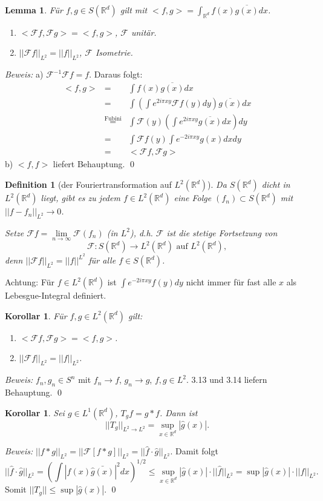 \documentclass[12pt]{extreport} %
\newtheorem{Definition}[Satz]{Definition}
\newtheorem{Lemma}[Satz]{Lemma}
\newtheorem{Korollar}[Satz]{Korollar}
\numberwithin{equation}{section}
\newcommand{\R}{\mathbb{R}} %
\newcommand{\f}{\hat{f}}
\newcommand{\g}{\hat{g}}
\newcommand{\F}{\mathcal{F}}
\newcommand{\m}{\cdot}
\newcommand{\Bew}{\emph{Beweis: }}
\begin{document}
	\begin{Lemma}
		Für $f, g\in S(\R^d)$ gilt mit $<f,g> = \int_{\R^{d}} f(x) \overline{g(x)}dx$.
		\begin{enumerate}
			\item[a)] $<\F f,\F g> = <f,g>$, $\F$ unitär.
			\item[b)] $||\F f||_{L^2} = ||f||_{L^2}$, $\F$ Isometrie.
		\end{enumerate}
	\end{Lemma}
	\Bew a) $\F^{-1}\F f = f$. Daraus folgt:
	\begin{eqnarray}
		<f,g> &=&\int f(x)\overline{g(x)}dx\nonumber\\
		&=& \int\left(\int e^{2i\pi x y}\F f(y)dy \right)\overline{g(x)}dx \nonumber \\
		&\overset{\text{Fubini}}{=}& \int \F(y)\left(\int e^{2i\pi xy} \overline{g(x)}dx\right)dy\nonumber\\
		&=& \int \F f(y) \int e^{-2i\pi xy}g(x)dx dy\nonumber\\
		&=& <\F f, \F g>\nonumber
	\end{eqnarray}
	b) $<f,f>$ liefert Behauptung.
	\qed
	
	\begin{Definition}[der Fouriertransformation auf $L^2(\R^d)$]
		Da $S(\R^d)$ dicht in $L^{2}(\R^d)$ liegt, gibt es zu jedem $f\in L^{2}(\R^d)$ eine Folge $(f_n)\subset S(\R^d)$ mit $||f-f_n||_{L^2}\rightarrow 0$.
		
		Setze $\F f =\lim\limits_{n\rightarrow\infty}\F(f_n)$ (in $L^2$), d.h. $\F$ ist die stetige Fortsetzung von 
		$$\F:S(\R^d)\rightarrow L^2(\R^d) \text{ auf } L^2(\R^d),$$	
		denn $||\F f||_{L^2} = ||f||^{L^2}$ für alle $f\in S(\R^d)$.
	\end{Definition}
	Achtung: Für $f\in L^2(\R^d)$ ist $\int e^{-2i\pi xy}f(y)dy$ nicht immer für fast alle $x$ als Lebesgue-Integral definiert.
	
	\begin{Korollar}
		Für $f, g\in L^2(\R^d)$ gilt:
		\begin{enumerate}
			\item[a)] $<\F f,\F g> = <f,g>$.
			\item[b)] $||\F f||_{L^2} = ||f||_{L^2}$.
		\end{enumerate}
	\end{Korollar}
	\Bew $f_n,g_n\in S^n$ mit $f_n\rightarrow f$, $g_n\rightarrow g$, $f,g\in L^2$. 3.13 und 3.14 liefern Behauptung.
	\qed
	
	\begin{Korollar}
		Sei $g\in L^{1}(\R^d)$, $T_g f= g*f$. Dann ist 
		$$||T_g||_{L^2\rightarrow L^2} = \sup_{x\in \R^d}|\g(x)|.$$
	\end{Korollar}
	\Bew $||f*g||_{L^2} = ||\F[f*g]||_{L^2} = ||\f\m\g||_{L^2}$.  Damit folgt
	$$||\f\m\g||_{L^2} = \left(\int |f(x)\bar{\g(x)}|^2 dx \right)^{1/2}\leq \sup_{x\in \R^d}|\g(x)|\m||\f||_{L^2} = \sup|\g(x)|\m ||f||_{L^2}.$$
	Somit $||T_g||\leq \sup|\g(x)|$.
	\qed 
	
\end{document}
